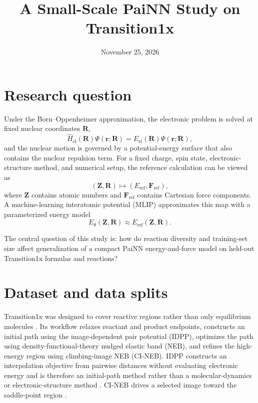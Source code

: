 \documentclass[11pt,a4paper]{article}
\title{\textbf{A Small-Scale PaiNN Study on Transition1x}}
\author{\reportauthor}
\date{November 25, 2026}
\begin{document}
\pagestyle{plain}
\maketitle


\section{Research question}

Under the Born--Oppenheimer approximation, the electronic problem is solved at fixed
nuclear coordinates $\bm R$,
\begin{equation}
  \hat H_{\mathrm{el}}(\bm R)\Psi(\bm r;\bm R)
  = E_{\mathrm{el}}(\bm R)\Psi(\bm r;\bm R),
\end{equation}
and the nuclear motion is governed by a potential-energy surface that also contains
the nuclear repulsion term. For a fixed charge, spin state, electronic-structure
method, and numerical setup, the reference calculation can be viewed as
\begin{equation}
  (\bm Z,\bm R) \longmapsto
  \left(E_{\mathrm{ref}},\bm F_{\mathrm{ref}}\right),
\end{equation}
where $\bm Z$ contains atomic numbers and $\bm F_{\mathrm{ref}}$ contains Cartesian
force components. A machine-learning interatomic potential (MLIP) approximates this
map with a parameterized energy model
\begin{equation}
  E_{\theta}(\bm Z,\bm R) \approx E_{\mathrm{ref}}(\bm Z,\bm R).
\end{equation}

The central question of this study is: how do reaction diversity and training-set
size affect generalization of a compact PaiNN energy-and-force model on held-out
Transition1x formulas and reactions?


\section{Dataset and data splits}

Transition1x was designed to cover reactive regions rather than only equilibrium
molecules \citep{schreiner2022transition1x}. Its workflow relaxes reactant and product
endpoints, constructs an initial path using the image-dependent pair potential (IDPP),
optimizes the path using density-functional-theory nudged elastic band (NEB), and
refines the high-energy region using climbing-image NEB (CI-NEB). IDPP constructs an
interpolation objective from pairwise distances without evaluating electronic energy
and is therefore an initial-path method rather than a molecular-dynamics or
electronic-structure method \citep{smidstrup2014idpp}. CI-NEB drives a selected image
toward the saddle-point region \citep{henkelman2000cineb}.
\end{document}
